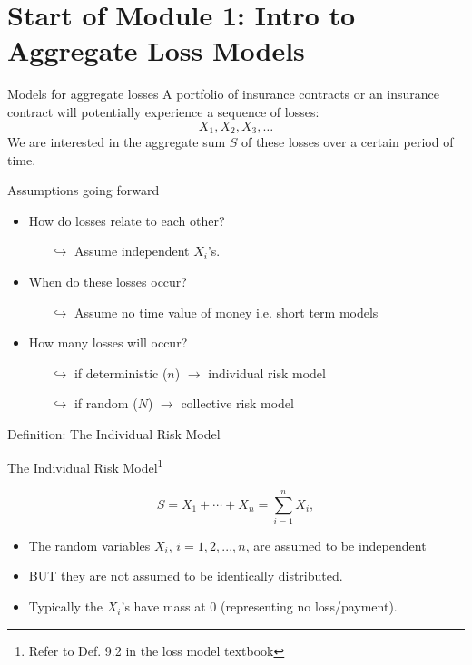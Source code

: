 \documentclass[11pt]{beamer}
\begin{document}
\section{Start of  Module 1: Intro to Aggregate Loss Models}
\begin{frame}{Models for aggregate losses}
  A portfolio of insurance contracts or an insurance contract will potentially experience a sequence of losses:
  \vfill
  $$X_1, X_2, X_3, \ldots$$
  \vfill
  We are interested in the aggregate sum $S$ of these losses over a certain period of time.

\end{frame}
\begin{frame}{Assumptions going forward}
\begin{itemize}
    
    \item How do losses relate to each other? 
    \begin{itemize}
    \item[$\hookrightarrow$] Assume independent $X_i$'s.
    \end{itemize}
    
\vfill    
    
    \item When do these losses occur?
    \begin{itemize}
    \item[$\hookrightarrow$] Assume no time value of money i.e. short term models 
    \end{itemize}
  
\vfill  
  
  \item How many losses will occur?
    \begin{itemize}
    \item[$\hookrightarrow$] if deterministic ($n$) $\longrightarrow$ individual risk model
    \item[$\hookrightarrow$] if random ($N$) $\longrightarrow$ collective risk model
    \end{itemize}



\end{itemize}
\end{frame}
\begin{frame}{Definition: The Individual Risk Model}

The Individual Risk Model\footnote{Refer to Def. 9.2 in the loss model textbook}

 $$S=X_{1}+\cdots +X_{n}=\sum_{i=1}^{n}X_{i},$$
 
 
  \begin{itemize}
  \item The random variables $X_{i}$, $i=1,2,...,n$, are assumed to be independent 
  \item BUT they are not assumed to be identically distributed.
  \item Typically the $X_i$'s have mass at $0$ (representing no loss/payment).
\end{itemize}

\end{frame}
\end{document}
